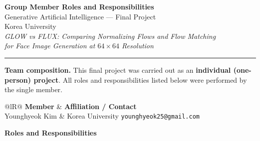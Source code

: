 \documentclass[11pt]{article}
\begin{document}
\begin{center}
    {\LARGE\bfseries Group Member Roles and Responsibilities}\\[6pt]
    {\large Generative Artificial Intelligence --- Final Project}\\[3pt]
    {\normalsize Korea University}\\[8pt]
    {\itshape GLOW vs FLUX: Comparing Normalizing Flows and Flow Matching\\
    for Face Image Generation at $64\times64$ Resolution}
\end{center}

\vspace{4pt}
\hrule
\vspace{10pt}

\textbf{Team composition.}\quad
This final project was carried out as an \textbf{individual (one-person) project}.
All roles and responsibilities listed below were performed by the single member.

\vspace{8pt}

\begin{tabularx}{\textwidth}{@{}lR@{}}
    \toprule
    \textbf{Member} & \textbf{Affiliation / Contact} \\
    \midrule
    Younghyeok Kim & Korea University \quad\textbullet\quad \texttt{younghyeok25@gmail.com} \\
    \bottomrule
\end{tabularx}

\vspace{14pt}

{\large\bfseries Roles and Responsibilities}

\vspace{6pt}
\end{document}
